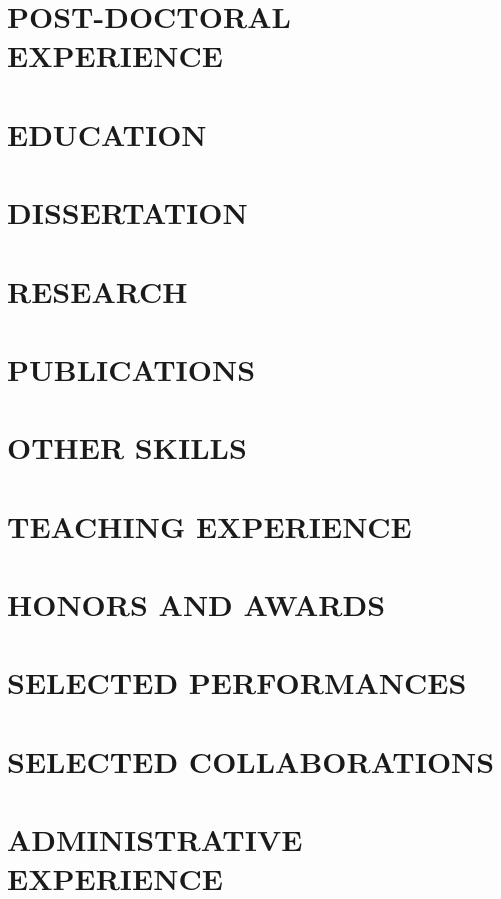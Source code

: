 \documentclass[overlapped,12pt]{res}
\begin{document}
\begin{resume}

\section{POST-DOCTORAL EXPERIENCE}


\section{EDUCATION}


\section{DISSERTATION}



\section{RESEARCH}


\pagebreak

\section{PUBLICATIONS}


\section{OTHER SKILLS}


\section{TEACHING EXPERIENCE}


\section{HONORS AND AWARDS}


\section{SELECTED PERFORMANCES}

\newpage
\section{SELECTED COLLABORATIONS}


\section{ADMINISTRATIVE EXPERIENCE}


\end{resume}
\end{document}
